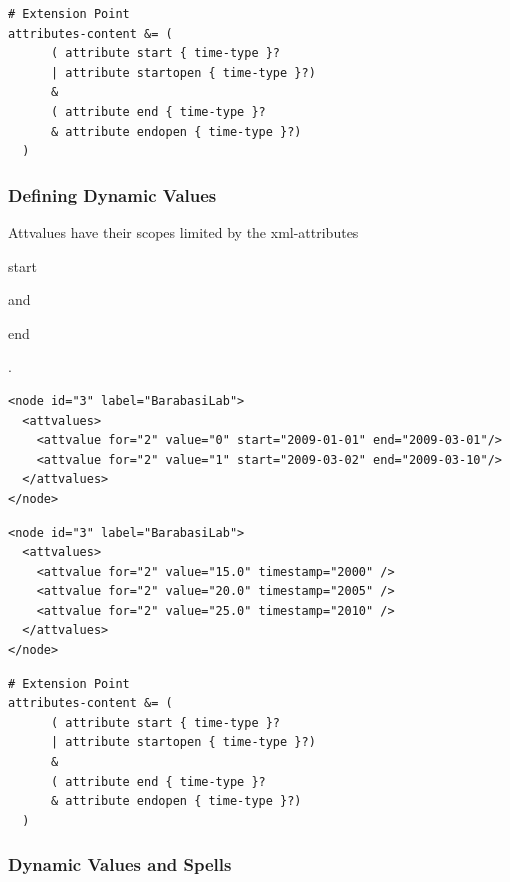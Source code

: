 \documentclass[a4paper,10pt]{article}
\begin{document}
\lstset{ style=rnc }
\begin{lstlisting}[caption={Dynamic Attributes Specification},label=dyndataRNC]
# Extension Point
attributes-content &= (
      ( attribute start { time-type }?
      | attribute startopen { time-type }?)
      &
      ( attribute end { time-type }?
      & attribute endopen { time-type }?)
  )
\end{lstlisting}

\subsubsection{Defining Dynamic Values}

Attvalues have their scopes limited by the xml-attributes \begin{footnotesize}start\end{footnotesize} and \begin{footnotesize}end\end{footnotesize}.

\lstset{ style=gexf }
\begin{lstlisting}[caption={Data value changing over time}]
<node id="3" label="BarabasiLab">
  <attvalues>
    <attvalue for="2" value="0" start="2009-01-01" end="2009-03-01"/>
    <attvalue for="2" value="1" start="2009-03-02" end="2009-03-10"/>
  </attvalues>
</node>
\end{lstlisting}

\lstset{ style=gexf }
\begin{lstlisting}[caption={Using timestamp representation}]
<node id="3" label="BarabasiLab">
  <attvalues>
    <attvalue for="2" value="15.0" timestamp="2000" />
    <attvalue for="2" value="20.0" timestamp="2005" />
    <attvalue for="2" value="25.0" timestamp="2010" />
  </attvalues>
</node>
\end{lstlisting}

\lstset{ style=rnc }
\begin{lstlisting}[caption={Dynamic Values Specification},label=dynvalRNC]
# Extension Point
attributes-content &= (
      ( attribute start { time-type }?
      | attribute startopen { time-type }?)
      &
      ( attribute end { time-type }?
      & attribute endopen { time-type }?)
  )
\end{lstlisting}

\subsubsection{Dynamic Values and Spells}
\end{document}
